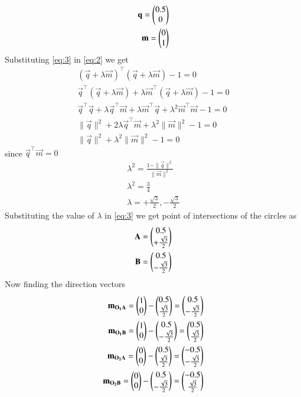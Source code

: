 \documentclass[journal,12pt,twocolumn]{IEEEtran}
\begin{document}
\begin{enumerate}
\begin{align}
   \mathbf{q}=\begin{pmatrix}0.5\\0\end{pmatrix}\\
   \mathbf{m}=\begin{pmatrix}0\\1\end{pmatrix}
\end{align}
Substituting \eqref{eq:3} in \eqref{eq:2} we get
\begin{align}
 (\vec{q}+\lambda\vec{m})^\top (\vec{q}+\lambda\vec{m})-1=0\\
 \vec{q}^\top(\vec{q}+\lambda\vec{m})+\lambda\vec{m}^\top(\vec{q}+\lambda\vec{m})-1=0\\
 \vec{q}^\top\vec{q} +  \lambda\vec{q}^\top\vec{m} + \lambda\vec{m}^\top\vec{q} +  \lambda^2\vec{m}^\top\vec{m} -1=0\\
 \|\vec{q}\|^2 + 2\lambda\vec{q}^\top\vec{m} + \lambda^2\|\vec{m}\|^2 -1=0\\
  \|\vec{q}\|^2 + \lambda^2\|\vec{m}\|^2 -1=0 
\end{align}
 since $ \vec{q}^\top\vec{m}=0 $
\begin{align}
  \lambda^2= \frac{1- \|\vec{q}\|^2}{\|\vec{m}\|^2}\\
  \lambda^2=\frac{3}{4}\\
    \lambda= +\frac{\sqrt{3}}{2},-\frac{\sqrt{3}}{2}
\end{align}
Substituting the value of $\lambda$ in \eqref{eq:3} we get point of intersections of  the circles as
\begin{align}
   \mathbf{A}= \begin{pmatrix}0.5\\+\frac{\sqrt{3}}{2}\end{pmatrix}\\
\mathbf{B}= \begin{pmatrix}0.5\\-\frac{\sqrt{3}}{2}\end{pmatrix}
\end{align}
Now finding the direction vectors
\begin{align}
    \vec{m_{O_1A}}=\myvec{1\\0}-\myvec{0.5\\\frac{\sqrt{3}}{2}}=\myvec{0.5\\-\frac{\sqrt{3}}{2}}\\
     \vec{m_{O_1B}}=\myvec{1\\0}-\myvec{0.5\\-\frac{\sqrt{3}}{2}}=\myvec{0.5\\\frac{\sqrt{3}}{2}}\\
     \vec{m_{O_2A}}=\myvec{0\\0}-\myvec{0.5\\\frac{\sqrt{3}}{2}}=\myvec{-0.5\\-\frac{\sqrt{3}}{2}}\\
     \vec{m_{O_2B}}=\myvec{0\\0}-\myvec{0.5\\-\frac{\sqrt{3}}{2}}=\myvec{-0.5\\\frac{\sqrt{3}}{2}}\\

\end{align}
\end{enumerate}
\end{document}
